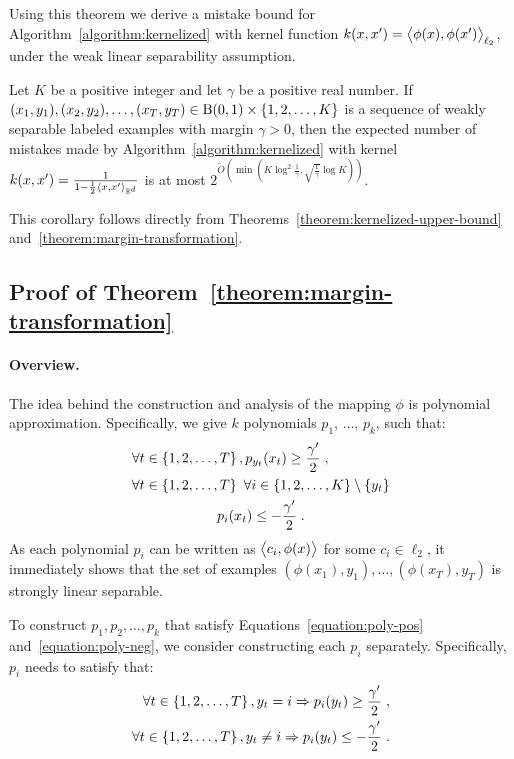 Using this theorem we derive a mistake bound for
Algorithm~\ref{algorithm:kernelized} with kernel function $k(x,x') =
\left\langle \phi(x), \phi(x') \right\rangle_{\ell_2}$, under the weak linear separability assumption.

\begin{corollary}
\label{corollary:weakly-separable-examples-mistake-upper-bound}
Let $K$ be a positive integer and let $\gamma$ be a positive real number. If
$(x_1, y_1), (x_2, y_2), \dots, (x_T, y_T) \in \operatorname{B}(0,1) \times \{1,2,\dots,K\}$
is a sequence of weakly separable labeled examples with margin $\gamma > 0$,
then the expected number of mistakes made by Algorithm~\ref{algorithm:kernelized}
with kernel $k(x,x') = \frac{1}{1 - \frac{1}{2}\left\langle x, x' \right\rangle_{\mathbb{R}^d}}$
is at most $2^{\widetilde{O}(\min(K \log^2 \frac{1}{\gamma},
\sqrt{\frac{1}{\gamma}} \log K))}$.
\end{corollary}

This corollary follows directly from
Theorems~\ref{theorem:kernelized-upper-bound}
and~\ref{theorem:margin-transformation}.

\subsection{Proof of Theorem~\ref{theorem:margin-transformation}}
\label{section:margin-transformation}

\paragraph{Overview.} The idea behind the construction and analysis of the mapping
$\phi$ is polynomial approximation. Specifically, we give $k$ polynomials $p_1$,
$\ldots$, $p_k$, such that:
\begin{align}
\label{equation:poly-pos}
& \forall t \in \cbr{1,2,\dots,T}, p_{y_t}(x_t) \ge \frac{\gamma'}2 \; ,
\\
\label{equation:poly-neg}
& \begin{gathered}
\forall t \in \cbr{1,2,\dots,T} \ \forall i \in \cbr{1,2,\ldots,K} \setminus \cbr{y_t} \\
p_i(x_t) \leq -\frac{\gamma'}2 \; .
\end{gathered}
\end{align}
As each polynomial $p_i$ can be written as $\left\langle c_i, \phi(x) \right\rangle$ for some $c_i \in
\ell_2$, it immediately shows that the set of examples $(\phi(x_1),y_1), \ldots,
(\phi(x_T),y_T)$ is strongly linear separable.

To construct $p_1, p_2, \dots, p_k$ that satisfy
Equations~\eqref{equation:poly-pos} and~\eqref{equation:poly-neg}, we consider
constructing each $p_i$ separately. Specifically, $p_i$ needs to satisfy that:
\begin{align}
\label{equation:poly-pos-i}
\forall t \in \cbr{1,2,\dots,T}, y_t = i \Rightarrow p_i(y_t) \ge \frac{\gamma'}2 \; , \\
\label{equation:poly-neg-i}
\forall t \in \cbr{1,2,\dots,T}, y_t \neq i \Rightarrow p_i(y_t) \le -\frac{\gamma'}2 \; .
\end{align}

